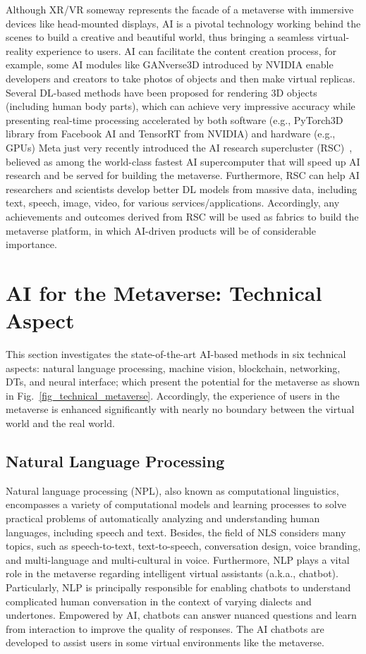 \documentclass[journal]{IEEEtran}
\begin{document}
Although XR/VR someway represents the facade of a metaverse with immersive devices like head-mounted displays, AI is a pivotal technology working behind the scenes to build a creative and beautiful world, thus bringing a seamless virtual-reality experience to users.
AI can facilitate the content creation process, for example, some AI modules like GANverse3D introduced by NVIDIA enable developers and creators to take photos of objects and then make virtual replicas. 
Several DL-based methods have been proposed for rendering 3D objects (including human body parts), which can achieve very impressive accuracy while presenting real-time processing accelerated by both software (e.g., PyTorch3D library from Facebook AI and TensorRT from NVIDIA) and hardware (e.g., GPUs) 
Meta just very recently introduced the AI research supercluster (RSC)~\cite{moore2022meta}, believed as among the world-class fastest AI supercomputer that will speed up AI research and be served for building the metaverse. Furthermore, RSC can help AI researchers and scientists develop better DL models from massive data, including text, speech, image, video, for various services/applications. Accordingly, any achievements and outcomes derived from RSC will be used as fabrics to build the metaverse platform, in which AI-driven products will be of considerable importance.

\section{AI for the Metaverse: Technical Aspect}
\label{sec_Technical}

This section investigates the state-of-the-art AI-based methods in six technical aspects: natural language processing, machine vision, blockchain, networking, DTs, and neural interface; which present the potential for the metaverse as shown in Fig.~\ref{fig_technical_metaverse}. Accordingly, the experience of users in the metaverse is enhanced significantly with nearly no boundary between the virtual world and the real world. 

\subsection{Natural Language Processing}
Natural language processing (NPL), also known as computational linguistics, encompasses a variety of computational models and learning processes to solve practical problems of automatically analyzing and understanding human languages, including speech and text. Besides, the field of NLS considers many topics, such as speech-to-text, text-to-speech, conversation design, voice branding, and multi-language and multi-cultural in voice. Furthermore, NLP plays a vital role in the metaverse regarding intelligent virtual assistants (a.k.a., chatbot). Particularly, NLP is principally responsible for enabling chatbots to understand complicated human conversation in the context of varying dialects and undertones. Empowered by AI, chatbots can answer nuanced questions and learn from interaction to improve the quality of responses. The AI chatbots are developed to assist users in some virtual environments like the metaverse.
\end{document}
